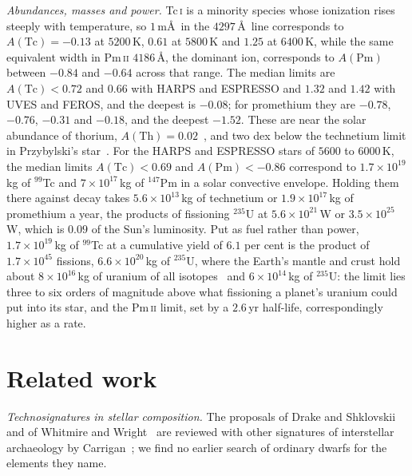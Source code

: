 \documentclass[3p,11pt]{elsarticle}
\newcommand{\sci}[2]{#1\times10^{#2}}
\newcommand{\ion}[2]{#1\,\textsc{#2}}
\newcommand{\nuc}[2]{$^{#1}$#2}
\begin{document}
\emph{Abundances, masses and power.} \ion{Tc}{i} is a minority species whose ionization
rises steeply with temperature, so $1$\,m\AA\ in the $4297$\,\AA\ line corresponds to
$A(\mathrm{Tc})=-0.13$ at $5200$\,K, $0.61$ at $5800$\,K and $1.25$ at $6400$\,K, while
the same equivalent width in \ion{Pm}{ii} $4186$\,\AA, the dominant ion, corresponds to
$A(\mathrm{Pm})$ between $-0.84$ and $-0.64$ across that range. The median limits are
$A(\mathrm{Tc})<0.72$ and $0.66$ with HARPS and ESPRESSO and $1.32$ and $1.42$ with UVES
and FEROS, and the deepest is $-0.08$; for promethium they are $-0.78$, $-0.76$,
$-0.31$ and $-0.18$, and the deepest $-1.52$. These are near the solar abundance of
thorium, $A(\mathrm{Th})=0.02$~\cite{Asplund2009}, and two dex below the technetium limit
in Przybylski's star~\cite{Andrievsky2023}. For the HARPS and ESPRESSO stars of
$5600$ to $6000$\,K, the median limits $A(\mathrm{Tc})<0.69$ and $A(\mathrm{Pm})<-0.86$
correspond to $\sci{1.7}{19}$\,kg of \nuc{99}{Tc} and $\sci{7}{17}$\,kg of
\nuc{147}{Pm} in a solar convective envelope. Holding them there against decay takes
$\sci{5.6}{13}$\,kg of technetium or $\sci{1.9}{17}$\,kg of promethium a year, the
products of fissioning \nuc{235}{U} at $\sci{5.6}{21}$\,W or $\sci{3.5}{25}$\,W, which
is $0.09$ of the Sun's luminosity. Put as fuel rather than power, $\sci{1.7}{19}$\,kg of
\nuc{99}{Tc} at a cumulative yield of $6.1$ per cent is the product of $\sci{1.7}{45}$
fissions, $\sci{6.6}{20}$\,kg of \nuc{235}{U}, where the Earth's mantle and crust hold
about $\sci{8}{16}$\,kg of uranium of all isotopes~\cite{McDonough1995} and
$\sci{6}{14}$\,kg of \nuc{235}{U}: the limit lies three to six orders of magnitude above
what fissioning a planet's uranium could put into its star, and the \ion{Pm}{ii} limit,
set by a $2.6$\,yr half-life, correspondingly higher as a rate.

\section{Related work}\label{sec:related}

\emph{Technosignatures in stellar composition.} The proposals of Drake and
Shklovskii~\cite{ShklovskiiSagan1966} and of Whitmire and Wright~\cite{WhitmireWright1980}
are reviewed with other signatures of interstellar archaeology by
Carrigan~\cite{Carrigan2010}; we find no earlier search of ordinary dwarfs for the
elements they name.
\end{document}
